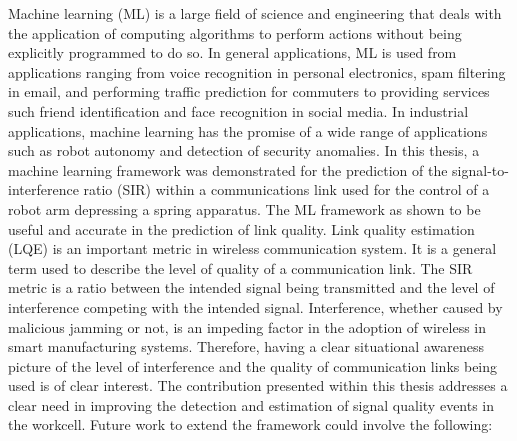 Machine learning (ML) is a large field of science and engineering that deals with the application of computing algorithms to perform actions without being explicitly programmed to do so.  In general applications, ML is used from applications ranging from voice recognition in personal electronics, spam filtering in email, and performing traffic prediction for commuters to providing services such friend identification and face recognition in social media.  In industrial applications, machine learning has the promise of a wide range of applications such as robot autonomy and detection of security anomalies. In this thesis, a machine learning framework was demonstrated for the prediction of the signal-to-interference ratio (SIR) within a communications link used for the control of a robot arm depressing a spring apparatus.  The ML framework as shown to be useful and accurate in the prediction of link quality.  Link quality estimation (LQE) is an important metric in wireless communication system.  It is a general term used to describe the level of quality of a communication link.  The SIR metric is a ratio between the intended signal being transmitted and the level of interference competing with the intended signal.  Interference, whether caused by malicious jamming or not, is an impeding factor in the adoption of wireless in smart manufacturing systems.  Therefore, having a clear situational awareness picture of the level of interference and the quality of communication links being used is of clear interest.  The contribution presented within this thesis addresses a clear need in improving the detection and estimation of signal quality events in the workcell.  Future work to extend the framework could involve the following:

